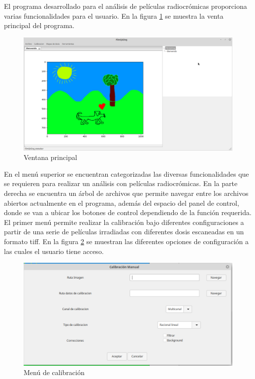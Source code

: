 El programa desarrollado para el análisis de películas radiocrómicas proporciona varias funcionalidades para el usuario. En la figura \ref{fig:ventanaPrincipal} se muestra la venta principal del programa.\\
\begin{figure}[H]
	\centering
	\includegraphics[width=0.7\linewidth]{images/imagenesDocumentacion/ventanaPrincipal.png}
	\caption{Ventana principal }
	\label{fig:ventanaPrincipal}
\end{figure}

En el menú superior se encuentran categorizadas las diversas funcionalidades que se requieren para realizar un análisis con películas radiocrómicas. En la parte derecha se encuentra un árbol de archivos que permite navegar entre los archivos abiertos actualmente en el programa, además del espacio del panel de control, donde se van a ubicar los botones de control dependiendo de la función requerida.\\

El primer menú permite realizar la calibración bajo diferentes configuraciones a partir de una serie de películas irradiadas con diferentes dosis escaneadas en un formato tiff. En la figura \ref{fig:menuCalibracion} se muestran las diferentes opciones de configuración a las cuales el usuario tiene acceso.\\
\begin{figure}[H]
	\centering
	\includegraphics[width=0.7\linewidth]{images/imagenesDocumentacion/menuCalibracion.png}
	\caption{Menú de calibración }
	\label{fig:menuCalibracion}
\end{figure}

